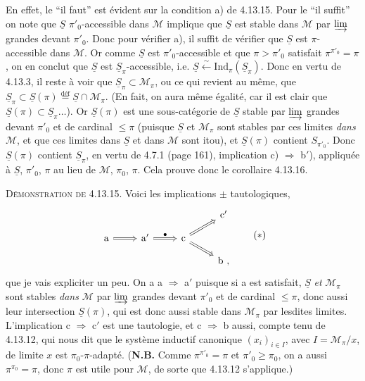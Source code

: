 \documentclass[11pt]{article}
\newcommand{\printedpage}[1]{\marginpar{\footnotesize p.~#1}}
\newcommand{\msp}[1]{\marginpar{\footnotesize [#1]}}
\newcommand{\uS}{\underline{S}}
\begin{document}
En effet, le “il faut” est évident sur la condition a) de 4.13.15. Pour le “il suffit” on note que $\uS$ $\pi'_0$-accessible dans $\mathcal{M}$ implique que $\uS$ est stable dans $\mathcal{M}$ par $\varinjlim$ grandes devant $\pi'_0$. Donc pour vérifier a), il suffit de vérifier que $\uS$ est $\pi$-accessible dans $\mathcal{M}$. Or comme $\uS$ est\msp{page 310} $\pi'_0$-accessible et que $\pi > \pi'_0$ satisfait $\pi^{\pi'_0} = \pi$, on en conclut que $\uS$ est $\uS_\pi$-accessible, i.e. $\uS \xleftarrow{\ \sim\ } \mathrm{Ind}_\pi(\uS_\pi)$. Donc en vertu de 4.13.3, il reste à voir que $\uS_\pi \subset \mathcal{M}_\pi$, ou ce qui revient au même, que $\uS_\pi \subset \uS(\pi) \overset{\text{déf}}{=} \uS \cap \mathcal{M}_\pi$. (En fait, on aura même égalité, car il est clair que $\uS(\pi) \subset \uS_\pi \ldots$). Or $\uS(\pi)$ est une sous-catégorie de $\uS$ stable par $\varinjlim$ grandes devant $\pi'_0$ et de cardinal $\leqslant \pi$ (puisque $\uS$ et $\mathcal{M}_\pi$ sont stables par ces limites \textit{dans} $\mathcal{M}$, et que ces limites dans $\uS$ et dans $\mathcal{M}$ sont itou), et $\uS(\pi)$ contient $S_{\pi'_0}$. Donc $\uS(\pi)$ contient $\uS_\pi$, en vertu de 4.7.1 (page 161), implication c) $\Longrightarrow$ b$'$), appliquée à $\uS$, $\pi'_0$, $\pi$ au lieu de $\mathcal{M}$, $\pi_0$, $\pi$. Cela prouve donc le corollaire 4.13.16. %

\textsc{Démonstration de} 4.13.15. Voici les implications $\pm$ tautologiques,
\[
\begin{tikzcd}[row sep=small]
 & & & \mathrm{c}' \\
\mathrm{a} \arrow[r, Rightarrow] & \mathrm{a}' \arrow[r, Rightarrow, "\bullet"] & \mathrm{c} \arrow[ur, Rightarrow] \arrow[dr, Rightarrow] & \\
 & & & \mathrm{b}\ ,
\end{tikzcd}
\tag*{$(*)$}
\]
\msp{page 311}que je vais expliciter un peu. On a a $\Longrightarrow$ a$'$ puisque si a est satisfait, $\uS$ \textit{et} $\mathcal{M}_\pi$ sont stables \textit{dans} $\mathcal{M}$ par $\varinjlim$ grandes devant $\pi'_0$ et de cardinal $\leqslant \pi$, donc aussi leur intersection $\uS(\pi)$,
\printedpage{117}
qui est donc aussi stable dans $\mathcal{M}_\pi$ par lesdites limites. L'implication c $\Longrightarrow$ c$'$ est une tautologie, et c $\Longrightarrow$ b aussi, compte tenu de 4.13.12, qui nous dit que le système inductif canonique $(x_i)_{i\in I}$, avec $I = \mathcal{M}_\pi/x$, de limite $x$ est $\pi_0$-$\pi$-adapté. (\textbf{N.B.} Comme $\pi^{\pi'_0} = \pi$ et $\pi'_0 \geqslant \pi_0$, on a aussi $\pi^{\pi_0} = \pi$, donc $\pi$ est utile pour $\mathcal{M}$, de sorte que 4.13.12 s'applique.)
\end{document}
